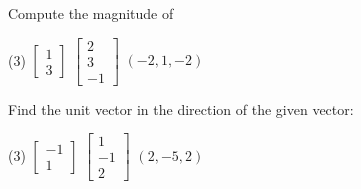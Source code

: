 \setcounter{exercise}{100}

\begin{exercise}
Compute the magnitude of
\begin{tasks}(3)
\task
$\begin{bmatrix}
1 \\
3
\end{bmatrix}
$
\task
$\begin{bmatrix}
2 \\
3 \\
-1
\end{bmatrix}
$
\task
$(-2,1,-2)$
\end{tasks}
\end{exercise}

\begin{exercise}
Find the unit vector in the direction of the given vector:
\begin{tasks}(3)
\task
$\begin{bmatrix}
-1 \\
1
\end{bmatrix}
$
\task
$\begin{bmatrix}
1 \\
-1 \\
2
\end{bmatrix}
$
\task
$(2,-5,2)$
\end{tasks}
\end{exercise}

